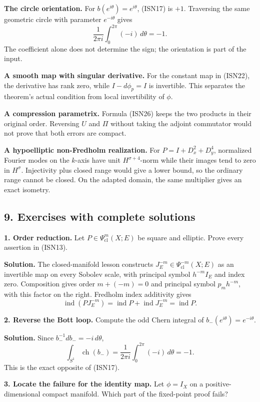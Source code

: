 \documentclass[
  11pt,
]{article}
\begin{document}
\textbf{The circle orientation.} For \(b(e^{i\theta})=e^{i\theta}\),
(ISN17) is \(+1\). Traversing the same geometric circle with parameter
\(e^{-i\theta}\) gives \[
 \frac{1}{2\pi i}\int_0^{2\pi}(-i)\,d\theta=-1.
\] The coefficient alone does not determine the sign; the orientation is
part of the input.

\textbf{A smooth map with singular derivative.} For the constant map in
(ISN22), the derivative has rank zero, while \(I-d\phi_p=I\) is
invertible. This separates the theorem's actual condition from local
invertibility of \(\phi\).

\textbf{A compression parametrix.} Formula (ISN26) keeps the two
products in their original order. Reversing \(U\) and \(\Pi\) without
taking the adjoint commutator would not prove that both errors are
compact.

\textbf{A hypoelliptic non-Fredholm realization.} For
\(P=I+D_x^2+D_y^4\), normalized Fourier modes on the \(k\)-axis have
unit \(H^{\sigma+4}\)-norm while their images tend to zero in
\(H^\sigma\). Injectivity plus closed range would give a lower bound, so
the ordinary range cannot be closed. On the adapted domain, the same
multiplier gives an exact isometry.

\subsection{9. Exercises with complete
solutions}\label{exercises-with-complete-solutions}

\textbf{1. Order reduction.} Let \(P\in\Psi^m_{\mathrm{cl}}(X;E)\) be
square and elliptic. Prove every assertion in (ISN13).

\textbf{Solution.} The closed-manifold lesson constructs
\(J_E^{-m}\in\Psi^{-m}_{\mathrm{cl}}(X;E)\) as an invertible map on
every Sobolev scale, with principal symbol \(h^{-m}I_E\) and index zero.
Composition gives order \(m+(-m)=0\) and principal symbol \(p_mh^{-m}\),
with this factor on the right. Fredholm index additivity gives \[
 \operatorname{ind}(PJ_E^{-m})
 =\operatorname{ind}P+\operatorname{ind}J_E^{-m}
 =\operatorname{ind}P.
\]

\textbf{2. Reverse the Bott loop.} Compute the odd Chern integral of
\(b_-(e^{i\theta})=e^{-i\theta}\).

\textbf{Solution.} Since \(b_-^{-1}db_-=-i\,d\theta\), \[
 \int_{S^1}\operatorname{ch}(b_-)
 =\frac{1}{2\pi i}\int_0^{2\pi}(-i)\,d\theta=-1.
\] This is the exact opposite of (ISN17).

\textbf{3. Locate the failure for the identity map.} Let \(\phi=I_X\) on
a positive-dimensional compact manifold. Which part of the fixed-point
proof fails?
\end{document}

